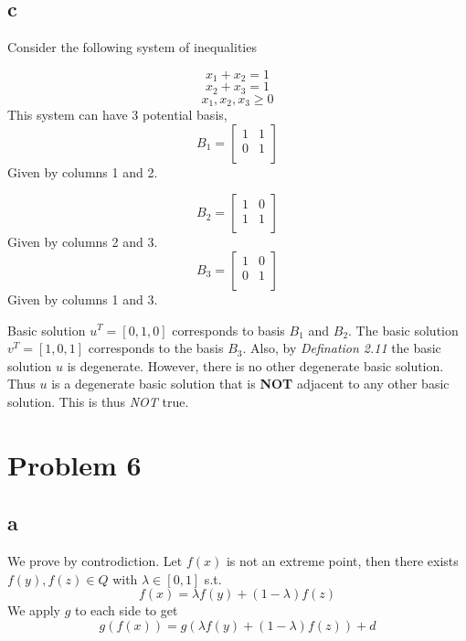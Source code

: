 \documentclass[11pt]{article}
\begin{document}
\subsection*{c}
Consider the following system of inequalities

\[ x_1 + x_2 = 1\]
\[x_2 + x_3 = 1\]
\[x_1,x_2,x_3 \ge 0\]
This system can have 3 potential basis, 
\[B_1 =  \begin{bmatrix}
    1 & 1  \\
    0 & 1 \\
    \end{bmatrix}\]
Given by columns 1 and 2.

\[B_2 =  \begin{bmatrix}
    1 & 0  \\
    1 & 1 \\
    \end{bmatrix}\]
Given by columns 2 and 3.
\[B_3 =  \begin{bmatrix}
    1 & 0  \\
    0 & 1 \\
    \end{bmatrix}\]
Given by columns 1 and 3.

Basic solution $u^T = [0,1,0]$ corresponds to basis $B_1$ and $B_2$. The basic solution $v^T = [1,0,1]$ corresponds to the basis $B_3$. Also, by \textit{Defination 2.11} the basic solution $u$ is degenerate. However, there is no other degenerate basic solution. Thus $u$ is a degenerate basic solution that is \textbf{NOT} adjacent to any other basic solution. This is thus \textit{NOT} true.

\section*{Problem 6}
\subsection*{a}
We prove by controdiction. Let $f(x)$ is not an extreme point, then there exists $f(y), f(z) \in Q$ with $\lambda \in [0,1]$ s.t.\\
\[f(x) = \lambda f(y) + (1-\lambda)f(z)\]
We apply $g$ to each side to get \\
\[g(f(x)) = g(\lambda f(y) + (1-\lambda)f(z)) + d\]
\end{document}
